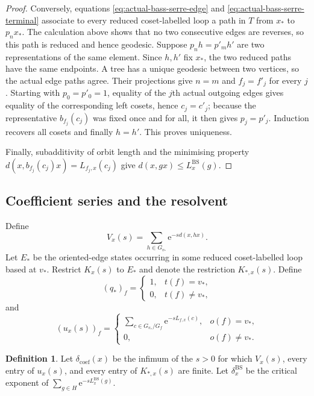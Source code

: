 \documentclass[11pt]{article}
\theoremstyle{definition}
\newtheorem{definition}[definition]{Definition}
\newcommand{\coef}{\mathrm{coef}}
\newcommand{\BS}{\mathrm{BS}}
\newcommand{\e}{\mathrm e}
\begin{document}
\begin{proof}
Conversely, equations \eqref{eq:actual-bass-serre-edge} and
\eqref{eq:actual-bass-serre-terminal} associate to every reduced coset-labelled loop a path
in $T$ from $x_*$ to $p_nx_*$.  The calculation above shows that no two consecutive edges
are reverses, so this path is reduced and hence geodesic.  Suppose
$p_nh=p'_mh'$ are two representations of the same element.  Since $h,h'$ fix $x_*$, the two
reduced paths have the same endpoints.  A tree has a unique geodesic between two vertices,
so the actual edge paths agree.  Their projections give $n=m$ and
$f_j=f'_j$ for every $j$.  Starting with $p_0=p'_0=1$, equality of the $j$th actual outgoing
edges gives equality of the corresponding left cosets, hence $c_j=c'_j$; because the
representative $b_{f_j}(c_j)$ was fixed once and for all, it then gives $p_j=p'_j$.
Induction recovers all cosets and finally $h=h'$.  This proves uniqueness.

Finally, subadditivity of orbit length and the minimising property
$d(x,b_{f_j}(c_j)x)=L_{f_j,x}(c_j)$ give
$d(x,gx)\le L_x^{\BS}(g)$.
\end{proof}

\subsection{Coefficient series and the resolvent}
Define
\[
 V_x(s)=\sum_{h\in G_{v_*}}\e^{-sd(x,hx)}.
\]
Let $E_*$ be the oriented-edge states occurring in some reduced coset-labelled loop based at
$v_*$.  Restrict $K_x(s)$ to $E_*$ and denote the restriction $K_{*,x}(s)$.  Define
\[
 (q_*)_f=\begin{cases}1,&t(f)=v_*,\\0,&t(f)\ne v_*,\end{cases}
\]
and
\[
 (u_x(s))_f=
 \begin{cases}
 \displaystyle\sum_{c\in G_{v_*}/G_f}\e^{-sL_{f,x}(c)},&o(f)=v_*,\\[1.2ex]
 0,&o(f)\ne v_*.
 \end{cases}
\]


\begin{definition}
\label{def:coef-abscissa}
Let $\delta_{\coef}(x)$ be the infimum of the $s>0$ for which $V_x(s)$, every entry of
$u_x(s)$, and every entry of $K_{*,x}(s)$ are finite.  Let
$\delta^{\BS}_x$ be the critical exponent of
$\sum_{g\in H}\e^{-sL^{\BS}_x(g)}$.
\end{definition}
\end{document}
